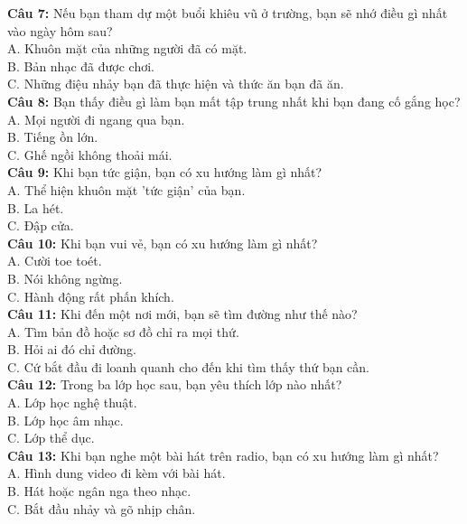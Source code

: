 \begin{multicols}{2}
\textbf{Câu 7:} Nếu bạn tham dự một buổi khiêu vũ ở trường, bạn sẽ nhớ điều gì nhất vào ngày hôm sau? \\
A. Khuôn mặt của những người đã có mặt. \\
B. Bản nhạc đã được chơi. \\
C. Những điệu nhảy bạn đã thực hiện và thức ăn bạn đã ăn. \\

\textbf{Câu 8:} Bạn thấy điều gì làm bạn mất tập trung nhất khi bạn đang cố gắng học? \\
A. Mọi người đi ngang qua bạn. \\
B. Tiếng ồn lớn. \\
C. Ghế ngồi không thoải mái. \\

\textbf{Câu 9:} Khi bạn tức giận, bạn có xu hướng làm gì nhất? \\
A. Thể hiện khuôn mặt 'tức giận' của bạn. \\
B. La hét. \\
C. Đập cửa. \\

\textbf{Câu 10:} Khi bạn vui vẻ, bạn có xu hướng làm gì nhất? \\
A. Cười toe toét. \\
B. Nói không ngừng. \\
C. Hành động rất phấn khích. \\
\textbf{Câu 11:} Khi đến một nơi mới, bạn sẽ tìm đường như thế nào? \\
A. Tìm bản đồ hoặc sơ đồ chỉ ra mọi thứ. \\
B. Hỏi ai đó chỉ đường. \\
C. Cứ bắt đầu đi loanh quanh cho đến khi tìm thấy thứ bạn cần. \\

\textbf{Câu 12:} Trong ba lớp học sau, bạn yêu thích lớp nào nhất? \\
A. Lớp học nghệ thuật. \\
B. Lớp học âm nhạc. \\
C. Lớp thể dục. \\

\textbf{Câu 13:} Khi bạn nghe một bài hát trên radio, bạn có xu hướng làm gì nhất? \\
A. Hình dung video đi kèm với bài hát. \\
B. Hát hoặc ngân nga theo nhạc. \\
C. Bắt đầu nhảy và gõ nhịp chân. \\


\end{multicols}

